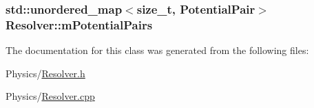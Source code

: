 \subsubsection[{\texorpdfstring{m\+Potential\+Pairs}{mPotentialPairs}}]{\setlength{\rightskip}{0pt plus 5cm}std\+::unordered\+\_\+map$<$size\+\_\+t, {\bf Potential\+Pair}$>$ Resolver\+::m\+Potential\+Pairs\hspace{0.3cm}{\ttfamily [private]}}\hypertarget{classResolver_a0252400c555ad722d8dad2cdc61359d6}{}\label{classResolver_a0252400c555ad722d8dad2cdc61359d6}


The documentation for this class was generated from the following files\+:\begin{DoxyCompactItemize}
\item 
Physics/\hyperlink{Resolver_8h}{Resolver.\+h}\item 
Physics/\hyperlink{Resolver_8cpp}{Resolver.\+cpp}\end{DoxyCompactItemize}
